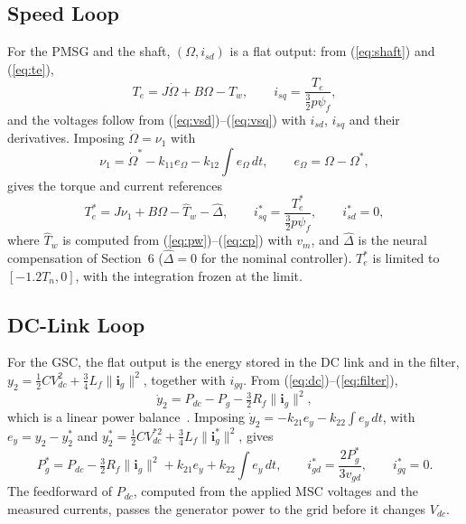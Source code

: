 \documentclass[11pt,a4paper]{article}
\newcommand{\bv}[1]{\mathbf{#1}}
\begin{document}
\subsection{Speed Loop}
For the PMSG and the shaft, $(\Omega, i_{sd})$ is a flat output: from (\ref{eq:shaft}) and (\ref{eq:te}),
\begin{equation}
T_e=J\dot\Omega+B\Omega-T_w,\qquad i_{sq}=\frac{T_e}{\frac32p\psi_f},
\end{equation}
and the voltages follow from (\ref{eq:vsd})--(\ref{eq:vsq}) with $i_{sd}$, $i_{sq}$ and their
derivatives. Imposing $\dot\Omega=\nu_1$ with
\begin{equation}
\nu_1=\dot\Omega^*-k_{11}e_\Omega-k_{12}\!\int\!e_\Omega\,dt,\qquad e_\Omega=\Omega-\Omega^*,
\end{equation}
gives the torque and current references
\begin{equation}
T_e^* = J\nu_1 + B\Omega - \hat T_w - \hat\Delta,\qquad i_{sq}^*=\frac{T_e^*}{\frac32p\psi_f},\qquad i_{sd}^*=0,
\label{eq:flat1}
\end{equation}
where $\hat T_w$ is computed from (\ref{eq:pw})--(\ref{eq:cp}) with $v_m$, and $\hat\Delta$ is the neural
compensation of Section~6 ($\hat\Delta=0$ for the nominal controller). $T_e^*$ is limited to
$[-1.2T_n,0]$, with the integration frozen at the limit.

\subsection{DC-Link Loop}
For the GSC, the flat output is the energy stored in the DC link and in the filter,
$y_2=\frac12CV_{dc}^2+\frac34L_f\|\bv{i}_g\|^2$, together with $i_{gq}$. From (\ref{eq:dc})--(\ref{eq:filter}),
\begin{equation}
\dot y_2 = P_{dc} - P_g - \tfrac32R_f\|\bv{i}_g\|^2 ,
\label{eq:y2}
\end{equation}
which is a linear power balance~\cite{thounthong2010}. Imposing $\dot y_2=-k_{21}e_y-k_{22}\int e_y\,dt$,
with $e_y=y_2-y_2^*$ and $y_2^*=\frac12CV_{dc}^{*2}+\frac34L_f\|\bv{i}_g^*\|^2$, gives
\begin{equation}
P_g^* = P_{dc} - \tfrac32R_f\|\bv{i}_g\|^2 + k_{21}e_y + k_{22}\!\int\! e_y\,dt,\qquad
i_{gd}^*=\frac{2P_g^*}{3v_{gd}},\qquad i_{gq}^*=0 .
\label{eq:flat2}
\end{equation}
The feedforward of $P_{dc}$, computed from the applied MSC voltages and the measured currents, passes the
generator power to the grid before it changes $V_{dc}$.
\end{document}
